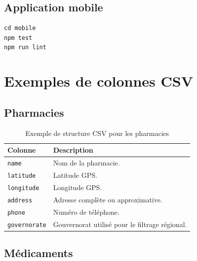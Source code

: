 \subsection*{Application mobile}

\begin{lstlisting}
cd mobile
npm test
npm run lint
\end{lstlisting}

\section{Exemples de colonnes CSV}

\subsection*{Pharmacies}

\begin{table}[H]
    \centering
    \caption{Exemple de structure CSV pour les pharmacies}
    \begin{tabular}{L{4cm}L{9cm}}
        \toprule
        \textbf{Colonne} & \textbf{Description} \\
        \midrule
        \texttt{name} & Nom de la pharmacie. \\
        \texttt{latitude} & Latitude GPS. \\
        \texttt{longitude} & Longitude GPS. \\
        \texttt{address} & Adresse complète ou approximative. \\
        \texttt{phone} & Numéro de téléphone. \\
        \texttt{governorate} & Gouvernorat utilisé pour le filtrage régional. \\
        \bottomrule
    \end{tabular}
\end{table}

\subsection*{Médicaments}

